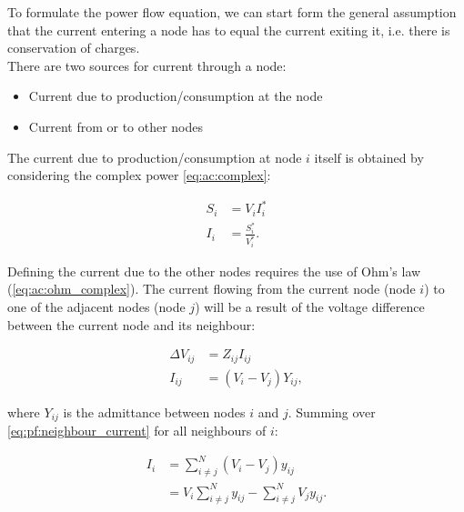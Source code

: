 To formulate the power flow equation, we can start form the general assumption
that the current entering a node has to equal the current exiting it, i.e.
there is conservation of charges.\\
There are two sources for current through a node:

\begin{itemize}
    \item Current due to production/consumption at the node
    \item Current from or to other nodes
\end{itemize}

The current due to production/consumption at node $i$ itself is
obtained by considering
the complex power \autoref{eq:ac:complex}:

\begin{equation}
    \begin{aligned}
        S_i     &= V_iI_i^*\\
        I_i     &= \frac{S_i^*}{V_i^*}.
    \end{aligned}
    \label{eq:pf:current_due_to_prosumer}
\end{equation}

Defining the current due to the other nodes requires the use of
Ohm's law (\autoref{eq:ac:ohm_complex}).
The current flowing from the current node (node $i$)
to one of the adjacent nodes (node $j$) will be a result of the
voltage difference between the current node and its neighbour:

\begin{equation}
    \begin{aligned}
        \Delta V_{ij} &= Z_{ij} I_{ij} \\
        I_{ij}        &= (V_i - V_j) Y_{ij},
    \end{aligned}
    \label{eq:pf:neighbour_current}
\end{equation}

where $Y_{ij}$ is the admittance between nodes $i$ and $j$.
Summing over \autoref{eq:pf:neighbour_current} for all neighbours of $i$:

\begin{equation}
    \begin{aligned}
        I_{i} &= \sum_{i \ne j}^N (V_i - V_j) y_{ij}\\
              &= V_i \sum_{i \ne j}^N y_{ij} - \sum_{i \ne j}^N V_j y_{ij}.
        \label{eq:pf:current_at_node}
    \end{aligned}
\end{equation}


